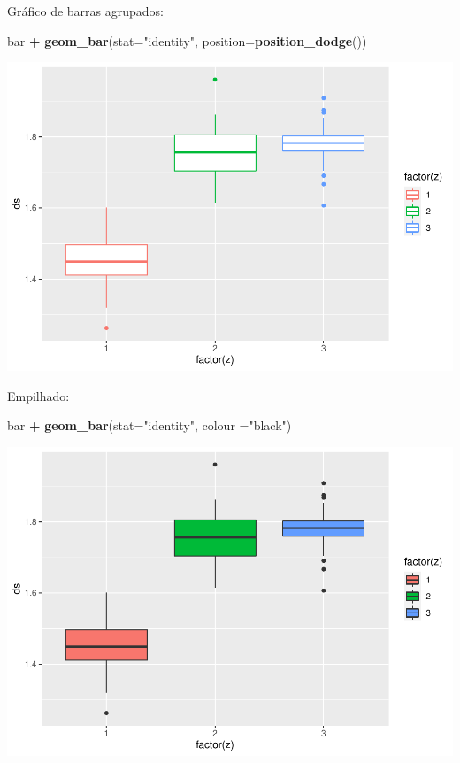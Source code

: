 \documentclass[
]{book}
\newenvironment{Shaded}{\begin{snugshade}}{\end{snugshade}}
\newcommand{\DataTypeTok}[1]{\textcolor[rgb]{0.13,0.29,0.53}{#1}}
\newcommand{\KeywordTok}[1]{\textcolor[rgb]{0.13,0.29,0.53}{\textbf{#1}}}
\newcommand{\NormalTok}[1]{#1}
\newcommand{\OperatorTok}[1]{\textcolor[rgb]{0.81,0.36,0.00}{\textbf{#1}}}
\newcommand{\StringTok}[1]{\textcolor[rgb]{0.31,0.60,0.02}{#1}}
\begin{document}
Gráfico de barras agrupados:

\begin{Shaded}
\begin{Highlighting}[]
\NormalTok{bar }\OperatorTok{+}\StringTok{   }\KeywordTok{geom_bar}\NormalTok{(}\DataTypeTok{stat=}\StringTok{"identity"}\NormalTok{, }\DataTypeTok{position=}\KeywordTok{position_dodge}\NormalTok{())}
\end{Highlighting}
\end{Shaded}

\includegraphics{TudodoR_files/figure-latex/unnamed-chunk-200-1.pdf}

Empilhado:

\begin{Shaded}
\begin{Highlighting}[]
\NormalTok{bar }\OperatorTok{+}\StringTok{   }\KeywordTok{geom_bar}\NormalTok{(}\DataTypeTok{stat=}\StringTok{"identity"}\NormalTok{, }\DataTypeTok{colour =}\StringTok{"black"}\NormalTok{)}
\end{Highlighting}
\end{Shaded}

\includegraphics{TudodoR_files/figure-latex/unnamed-chunk-201-1.pdf}
\end{document}

